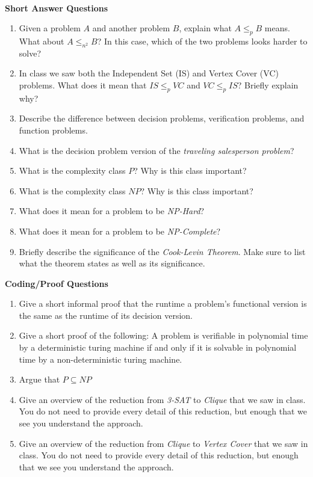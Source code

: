 \documentclass[10pt]{article}
\newcounter{pagenum}
\newcommand{\pageheader}[1]{
\clearpage\vspace*{-0.4in}\noindent{\large\bf{{#1}}}
\addtocounter{pagenum}{1}
\cfoot{}
}
\begin{document}
\pageheader{Reductions}

\noindent \\
\textbf{Short Answer Questions}

\begin{enumerate}
	\setlength\itemsep{0.25em}
	\item Given a problem $A$ and another problem $B$, explain what $A \leq_p B$ means. What about $A \leq_{n^2} B$? In this case, which of the two problems looks harder to solve?
	\item In class we saw both the Independent Set (IS) and Vertex Cover (VC) problems. What does it mean that $IS \leq_p VC$ and $VC \leq_p IS$? Briefly explain why?
	\item Describe the difference between decision problems, verification problems, and function problems.
	\item What is the decision problem version of the \emph{traveling salesperson problem}?
	\item What is the complexity class $P$? Why is this class important?
	\item What is the complexity class $NP$? Why is this class important?
	\item What does it mean for a problem to be \emph{NP-Hard}?
	\item What does it mean for a problem to be \emph{NP-Complete}?
	\item Briefly describe the significance of the \emph{Cook-Levin Theorem}. Make sure to list what the theorem states as well as its significance.
\end{enumerate}

\vspace{0.5in}

\textbf{Coding/Proof Questions}
\begin{enumerate}
	\setlength\itemsep{0.25em}
	\item Give a short informal proof that the runtime a problem's functional version is the same as the runtime of its decision version.
	\item Give a short proof of the following: A problem is verifiable in polynomial time by a deterministic turing machine if and only if it is solvable in polynomial time by a non-deterministic turing machine.
	\item Argue that $P \subseteq NP$
	\item Give an overview of the reduction from \emph{3-SAT} to \emph{Clique} that we saw in class. You do not need to provide every detail of this reduction, but enough that we see you understand the approach.
	\item Give an overview of the reduction from \emph{Clique} to \emph{Vertex Cover} that we saw in class. You do not need to provide every detail of this reduction, but enough that we see you understand the approach.


\end{enumerate}
\end{document}
